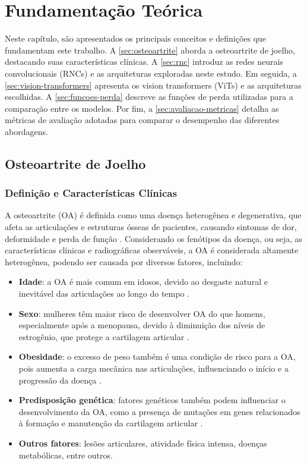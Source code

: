 \chapter{Fundamentação Teórica}\label{cap:fundamentacao}

Neste capítulo, são apresentados os principais conceitos e definições que fundamentam este trabalho. A \autoref{sec:osteoartrite} aborda a osteoartrite de joelho, destacando suas características clínicas. A \autoref{sec:rnc} introduz as redes neurais convolucionais (RNCs) e as arquiteturas exploradas neste estudo. Em seguida, a \autoref{sec:vision-transformers} apresenta os vision transformers (ViTs) e as arquiteturas escolhidas. A \autoref{sec:funcoes-perda} descreve as funções de perda utilizadas para a comparação entre os modelos. Por fim, a \autoref{sec:avaliacao-metricas} detalha as métricas de avaliação adotadas para comparar o desempenho das diferentes abordagens.

\section{Osteoartrite de Joelho}\label{sec:osteoartrite}

\subsection{Definição e Características Clínicas}

A osteoartrite (OA) é definida como uma doença heterogênea e degenerativa, que afeta as articulações e estruturas ósseas de pacientes, causando sintomas de dor, deformidade e perda de função \cite{Loeser2012}. Considerando os fenótipos da doença, ou seja, as características clínicas e radiográficas observáveis, a OA é considerada altamente heterogênea, podendo ser causada por diversos fatores, incluindo:

\begin{itemize}
    \item \textbf{Idade}: a OA é mais comum em idosos, devido ao desgaste natural e inevitável das articulações ao longo do tempo \cite{ShaneAnderson2010}.
    \item \textbf{Sexo}: mulheres têm maior risco de desenvolver OA do que homens, especialmente após a menopausa, devido à diminuição dos níveis de estrogênio, que protege a cartilagem articular \cite{Tschon2021}.
    \item \textbf{Obesidade}: o excesso de peso também é uma condição de risco para a OA, pois aumenta a carga mecânica nas articulações, influenciando o início e a progressão da doença \cite{PACCA2018}.
    \item \textbf{Predisposição genética}: fatores genéticos também podem influenciar o desenvolvimento da OA, como a presença de mutações em genes relacionados à formação e manutenção da cartilagem articular \cite{Spector2004}.
    \item \textbf{Outros fatores}: lesões articulares, atividade física intensa, doenças metabólicas, entre outros.
\end{itemize}

